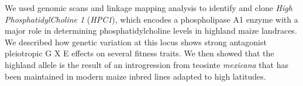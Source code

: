 \documentclass[9pt,twocolumn,twoside,lineno]{BioRxiv}
\begin{document}
We used genomic scans and linkage mapping analysis to identify and clone \textit{High PhosphatidylCholine 1} (\textit{HPC1}), which encodes a phospholipase A1 enzyme with a major role in determining phosphatidylcholine levels in highland maize landraces.
We described how genetic variation at this locus shows strong antagonist pleiotropic G X E effects on several fitness traits.
We then showed that the highland allele is the result of an introgression from teosinte \textit{mexicana} that has been maintained in modern maize inbred lines adapted to high latitudes.
\end{document}
